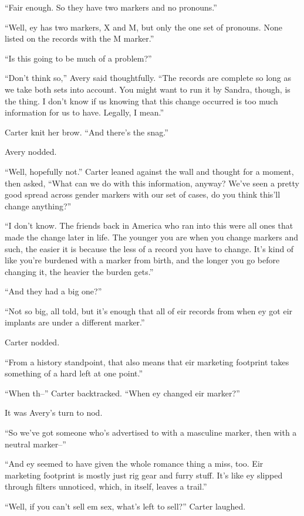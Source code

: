 ``Fair enough. So they have two markers and no pronouns.''

``Well, ey has two markers, X and M, but only the one set of pronouns. None listed on the records with the M marker.''

``Is this going to be much of a problem?''

``Don't think so,'' Avery said thoughtfully. ``The records are complete so long as we take both sets into account. You might want to run it by Sandra, though, is the thing. I don't know if us knowing that this change occurred is too much information for us to have. Legally, I mean.''

Carter knit her brow. ``And there's the snag.''

Avery nodded.

``Well, hopefully not.'' Carter leaned against the wall and thought for a moment, then asked, ``What can we do with this information, anyway? We've seen a pretty good spread across gender markers with our set of cases, do you think this'll change anything?''

``I don't know. The friends back in America who ran into this were all ones that made the change later in life. The younger you are when you change markers and such, the easier it is because the less of a record you have to change. It's kind of like you're burdened with a marker from birth, and the longer you go before changing it, the heavier the burden gets.''

``And they had a big one?''

``Not so big, all told, but it's enough that all of eir records from when ey got eir implants are under a different marker.''

Carter nodded.

``From a history standpoint, that also means that eir marketing footprint takes something of a hard left at one point.''

``When th--'' Carter backtracked. ``When ey changed eir marker?''

It was Avery's turn to nod.

``So we've got someone who's advertised to with a masculine marker, then with a neutral marker--''

``And ey seemed to have given the whole romance thing a miss, too. Eir marketing footprint is mostly just rig gear and furry stuff. It's like ey slipped through filters unnoticed, which, in itself, leaves a trail.''

``Well, if you can't sell em sex, what's left to sell?'' Carter laughed.

